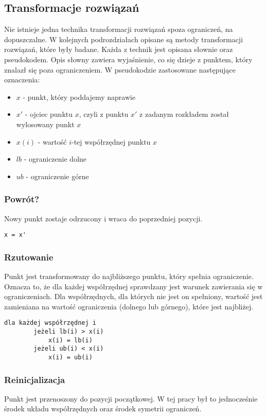 \documentclass{mini}
\begin{document}
\subsection{Transformacje rozwiązań} \label{transformacje}
Nie istnieje jedna technika transformacji rozwiązań spoza ograniczeń, na dopuszczalne. W kolejnych podrozdziałach opisane są metody transformacji rozwiązań, które były badane. Każda z technik jest opisana słownie oraz pseudokodem. Opis słowny zawiera wyjaśnienie, co się dzieje z punktem, który znalazł się poza ograniczeniem. W pseudokodzie zastosowane następujące oznaczenia:
\begin{itemize}[noitemsep]
\item $x$ - punkt, który poddajemy naprawie
\item $x'$ - ojciec punktu $x$, czyli z punktu $x'$ z zadanym rozkładem został wylosowany punkt $x$
\item $x(i)$ - wartość $i$-tej współrzędnej punktu $x$
\item $lb$ - ograniczenie dolne
\item $ub$ - ograniczenie górne
\end{itemize}

\subsubsection{Powrót?}
Nowy punkt zostaje odrzucony i wraca do poprzedniej pozycji.

\begin{Verbatim}[baselinestretch=1.1]
	x = x'
\end{Verbatim}


\subsubsection{Rzutowanie}
Punkt jest transformowany do najbliższego punktu, który spełnia ograniczenie. Oznacza to, że dla każdej współrzędnej sprawdzany jest warunek zawierania się w ograniczeniach. Dla współrzędnych, dla których nie jest on spełniony, wartość jest zamieniana na wartość ograniczenia (dolnego lub górnego), które jest najbliżej.

\begin{Verbatim}[baselinestretch=1.1]
	dla każdej współrzędnej i
		jeżeli lb(i) > x(i)
			x(i) = lb(i)
		jeżeli ub(i) < x(i)
			x(i) = ub(i)
\end{Verbatim}

\subsubsection{Reinicjalizacja}
Punkt jest przenoszony do pozycji początkowej. W tej pracy był to jednocześnie środek układu współrzędnych oraz środek symetrii ograniczeń.
\end{document}
